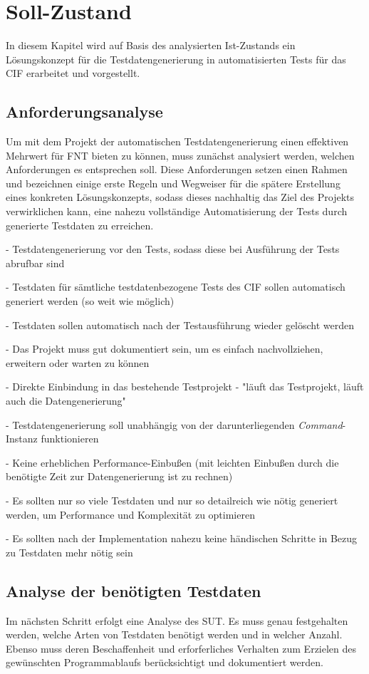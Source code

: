 \chapter{Soll-Zustand}\label{ch:sollzustand}
In diesem Kapitel wird auf Basis des analysierten Ist-Zustands ein Lösungskonzept für die Testdatengenerierung in automatisierten Tests für das \ac{CIF} erarbeitet und vorgestellt.

\section{Anforderungsanalyse}\label{sec:anforderungen}
Um mit dem Projekt der automatischen Testdatengenerierung einen effektiven Mehrwert für FNT bieten zu können, muss zunächst analysiert werden, welchen Anforderungen es entsprechen soll. Diese Anforderungen setzen einen Rahmen und bezeichnen einige erste Regeln und Wegweiser für die spätere Erstellung eines konkreten Lösungskonzepts, sodass dieses nachhaltig das Ziel des Projekts verwirklichen kann, eine nahezu vollständige Automatisierung der Tests durch generierte Testdaten zu erreichen.

- Testdatengenerierung vor den Tests, sodass diese bei Ausführung der Tests abrufbar sind

- Testdaten für sämtliche testdatenbezogene Tests des CIF sollen automatisch generiert werden (so weit wie möglich)

- Testdaten sollen automatisch nach der Testausführung wieder gelöscht werden

- Das Projekt muss gut dokumentiert sein, um es einfach nachvollziehen, erweitern oder warten zu können

- Direkte Einbindung in das bestehende Testprojekt - "läuft das Testprojekt, läuft auch die Datengenerierung"

- Testdatengenerierung soll unabhängig von der darunterliegenden \textit{Command}-Instanz funktionieren

- Keine erheblichen Performance-Einbußen (mit leichten Einbußen durch die benötigte Zeit zur Datengenerierung ist zu rechnen)

- Es sollten nur so viele Testdaten und nur so detailreich wie nötig generiert werden, um Performance und Komplexität zu optimieren

- Es sollten nach der Implementation nahezu keine händischen Schritte in Bezug zu Testdaten mehr nötig sein

\section{Analyse der benötigten Testdaten}\label{sec:testdatenanalyse}
Im nächsten Schritt erfolgt eine Analyse des \acf{SUT}. Es muss genau festgehalten werden, welche Arten von Testdaten benötigt werden und in welcher Anzahl. Ebenso muss deren Beschaffenheit und erforferliches Verhalten zum Erzielen des gewünschten Programmablaufs berücksichtigt und dokumentiert werden. 

